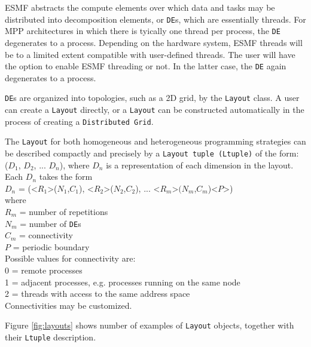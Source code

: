 ESMF abstracts the compute elements over which data and tasks may be
distributed into decomposition elements, or {\tt DE}s, which
are essentially threads.  For MPP architectures in which there
is tyically one thread per process, the {\tt DE} degenerates to a 
process.
Depending on the hardware system, ESMF threads will be to a limited 
extent compatible with user-defined threads.  The user will have 
the option to enable ESMF threading or not.  In the latter case, the
{\tt DE} again degenerates to a process.

{\tt DE}s are organized into topologies, such as a 2D grid, by the 
{\tt Layout} 
class.  A user can create a {\tt Layout} directly, or a {\tt Layout} can be 
constructed automatically in the process of creating a {\tt Distributed 
Grid}.  

The {\tt Layout} for both homogeneous and heterogeneous programming
strategies can be described compactly and precisely by a {\tt Layout 
tuple (Ltuple)} of the form: \\
($D_{1}$, $D_{2}$, ... $D_{n}$), where $D_{n}$ is a representation of
each dimension in the layout.  \\
Each $D_{n}$ takes the form \\
$D_{n}$ = (<$R_{1}$>($N_{1}$,$C_{1}$), <$R_{2}$>($N_{2}$,$C_{2}$), ... <$R_{m}$>$(N_{m}$,$C_{m}$)<$P$>) \\
where \\
$R_{m}$ = number of repetitions \\
$N_{m}$ = number of {\tt DE}s \\
$C_{m}$ = connectivity \\
$P$ = periodic boundary \\

Possible values for connectivity are: \\
0 = remote processes \\
1 = adjacent processes, e.g. processes running on the same node\\
2 = threads with access to the same address space \\
Connectivities may be customized.

Figure \ref{fig:layouts} shows number of examples of {\tt Layout} objects,
together with their {\tt Ltuple} description.

